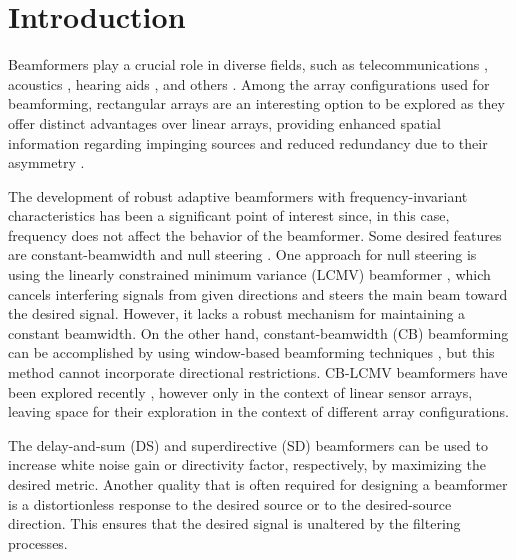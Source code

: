 \section{Introduction}
\label{sec:introduction}

Beamformers play a crucial role in diverse fields, such as telecommunications \cite{viswanath_opportunistic_2002}, acoustics \cite{herbordt_joint_2005,chiariotti_acoustic_2019}, hearing aids \cite{haykin_handbook_2009}, and others \cite{van_veen_beamforming_1988,liu_wideband_2010,huang_energy_2020,elbir_twenty-five_2023}. Among the array configurations used for beamforming, rectangular arrays are an interesting option to be explored \cite{gu_efficient_2019,zhang_two-dimensional_2019,lin_secrecy-energy_2021} as they offer distinct advantages over linear arrays, providing enhanced spatial information regarding impinging sources \cite{heidenreich_joint_2012,ioannides_uniform_2005} and reduced redundancy due to their asymmetry \cite{singh_minimal_2021}.

The development of robust adaptive beamformers with frequency-invariant characteristics has been a significant point of interest since, in this case, frequency does not affect the behavior of the beamformer. Some desired features are constant-beamwidth \cite{goodwin_constant_1993} and null steering \cite{zarifi_collaborative_2010}. One approach for null steering is using the linearly constrained minimum variance (LCMV) beamformer \cite{frost_algorithm_1972,buckley_spatialspectral_1987,souden_study_2010}, which cancels interfering signals from given directions and steers the main beam toward the desired signal. However, it lacks a robust mechanism for maintaining a constant beamwidth. On the other hand, constant-beamwidth (CB) beamforming \cite{hixson_widebandwidth_1970,goodwin_constant_1993,wang_constant-beamwidth_2004} can be accomplished by using window-based beamforming techniques \cite{long_window-based_2019}, but this method cannot incorporate directional restrictions. CB-LCMV beamformers have been explored recently \cite{frank_constant-beamwidth_2022-1}, however only in the context of linear sensor arrays, leaving space for their exploration in the context of different array configurations.

The delay-and-sum (DS) and superdirective (SD) beamformers {\cite{benesty_microphone_2008}} can be used to increase white noise gain or directivity factor, respectively, by maximizing the desired metric. Another quality that is often required for designing a beamformer is a distortionless response to the desired source or to the desired-source direction. This ensures that the desired signal is unaltered by the filtering processes.


